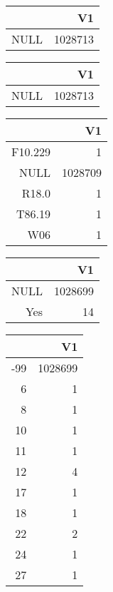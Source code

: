 \bigskip\bigskip
\centering
\begin{tabular}{rr}
  \hline
 & V1 \\ 
  \hline
NULL & 1028713 \\ 
   \hline
\end{tabular}

\bigskip\bigskip
\centering
\begin{tabular}{rr}
  \hline
 & V1 \\ 
  \hline
NULL & 1028713 \\ 
   \hline
\end{tabular}

\bigskip\bigskip
\centering
\begin{tabular}{rr}
  \hline
 & V1 \\ 
  \hline
F10.229 &   1 \\ 
  NULL & 1028709 \\ 
  R18.0 &   1 \\ 
  T86.19 &   1 \\ 
  W06 &   1 \\ 
   \hline
\end{tabular}

\bigskip\bigskip
\centering
\begin{tabular}{rr}
  \hline
 & V1 \\ 
  \hline
NULL & 1028699 \\ 
  Yes &  14 \\ 
   \hline
\end{tabular}

\bigskip\bigskip
\centering
\begin{tabular}{rr}
  \hline
 & V1 \\ 
  \hline
-99 & 1028699 \\ 
  6 &   1 \\ 
  8 &   1 \\ 
  10 &   1 \\ 
  11 &   1 \\ 
  12 &   4 \\ 
  17 &   1 \\ 
  18 &   1 \\ 
  22 &   2 \\ 
  24 &   1 \\ 
  27 &   1 \\ 
   \hline
\end{tabular}


